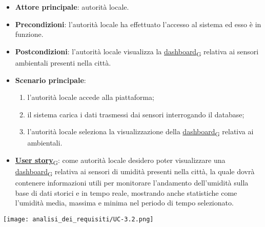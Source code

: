 \begin{itemize}
	\item \textbf{Attore principale}: autorità locale.
	\item \textbf{Precondizioni}: l'autorità locale ha effettuato l'accesso al sistema ed esso è in funzione.
	\item \textbf{Postcondizioni}: l'autorità locale visualizza la \href{https://7last.github.io/docs/pb/documentazione-interna/glossario\#dashboard}{dashboard\textsubscript{G}} relativa
	      ai sensori ambientali presenti nella città.
	\item \textbf{Scenario principale}:
	      \begin{enumerate}
		      \item l'autorità locale accede alla piattaforma;
		      \item il sistema carica i dati trasmessi dai sensori interrogando il database;
		      \item l'autorità locale seleziona la visualizzazione della \href{https://7last.github.io/docs/pb/documentazione-interna/glossario\#dashboard}{dashboard\textsubscript{G}} relativa ai ambientali.
	      \end{enumerate}
	\item \href{https://7last.github.io/docs/pb/documentazione-interna/glossario\#user-story}{\textbf{User story}\textsubscript{G}}:
	      come autorità locale desidero poter visualizzare una \href{https://7last.github.io/docs/pb/documentazione-interna/glossario\#dashboard}{dashboard\textsubscript{G}} relativa ai sensori di umidità presenti nella città, la quale
	      dovrà contenere informazioni utili per monitorare l'andamento dell'umidità sulla base di dati storici e in tempo reale, mostrando
	      anche statistiche come l'umidità media, massima e minima nel periodo di tempo selezionato.
\end{itemize}
\begin{center}
	\texttt{[image: analisi\_dei\_requisiti/UC-3.2.png]}
\end{center}


